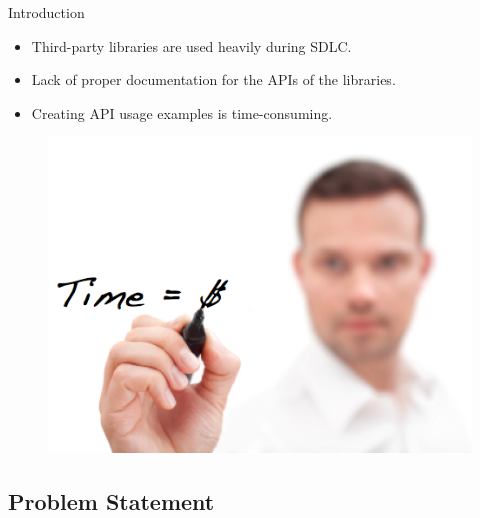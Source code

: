 \documentclass[11pt]{beamer}
\begin{document}
\begin{frame}{Introduction}{}
	\vspace{30pt}
	\begin{itemize}
		\item {
			Third-party libraries are used heavily during SDLC.
		}
		\item {
			Lack of proper documentation for the APIs of the libraries.
		}
		\item {
			Creating API usage examples is time-consuming.
		}
	\end{itemize}
	\begin{figure}
		\includegraphics[scale=0.25]{Time}
	\end{figure}
\end{frame}

\subsection{Problem Statement}
\end{document}

